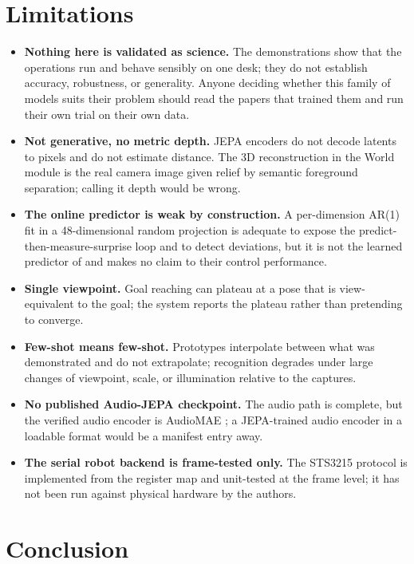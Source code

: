\documentclass[11pt,onecolumn]{article}
\begin{document}
\section{Limitations}
\label{sec:limits}

\begin{itemize}
  \item \textbf{Nothing here is validated as science.} The demonstrations show that the
  operations run and behave sensibly on one desk; they do not establish accuracy,
  robustness, or generality. Anyone deciding whether this family of models suits their
  problem should read the papers that trained them and run their own trial on their own
  data.
  \item \textbf{Not generative, no metric depth.} JEPA encoders do not decode latents to
  pixels and do not estimate distance. The 3D reconstruction in the World module is the
  real camera image given relief by semantic foreground separation; calling it depth would
  be wrong.
  \item \textbf{The online predictor is weak by construction.} A per-dimension AR(1) fit in
  a 48-dimensional random projection is adequate to expose the predict-then-measure-surprise
  loop and to detect deviations, but it is not the learned predictor of \cite{lewm2026} and
  makes no claim to their control performance.
  \item \textbf{Single viewpoint.} Goal reaching can plateau at a pose that is
  view-equivalent to the goal; the system reports the plateau rather than pretending to
  converge.
  \item \textbf{Few-shot means few-shot.} Prototypes interpolate between what was
  demonstrated and do not extrapolate; recognition degrades under large changes of
  viewpoint, scale, or illumination relative to the captures.
  \item \textbf{No published Audio-JEPA checkpoint.} The audio path is complete, but the
  verified audio encoder is AudioMAE \cite{audiomae2022}; a JEPA-trained audio encoder in a
  loadable format would be a manifest entry away.
  \item \textbf{The serial robot backend is frame-tested only.} The STS3215 protocol is
  implemented from the register map and unit-tested at the frame level; it has not been run
  against physical hardware by the authors.
\end{itemize}

\section{Conclusion}
\end{document}
